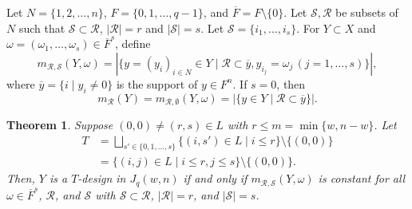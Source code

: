 \documentclass[a4paper, 11pt]{article}
\newtheorem{theorem}{Theorem}[section]
\theoremstyle{definition}
\begin{document}
Let $N=\{1,2,\ldots, n\}$, $F=\{0,1,\ldots, q-1\}$, and $\overline{F}=F\setminus \{0\}$. 
Let $\mathcal{S}, \mathcal{R}$  be subsets of $N$ such that $\mathcal{S} \subset \mathcal{R}$,  $|\mathcal{R}|=r$ and $|\mathcal{S}|=s$. 
Let $\mathcal{S}=\{i_1,\ldots, i_s\}$.  
For $Y \subset X$ and $\omega=(\omega_1,\ldots, \omega_s) \in \overline{F}^s$, define 
\[
m_{\mathcal{R},\mathcal{S}}(Y,\omega)
=|\{y=(y_i)_{i \in N} \in Y  \mid \mathcal{R} \subset \overline{y}, y_{i_j}=\omega_j\, (j=1,\ldots,s)  \}|, 
\]
where $\overline{y}=\{i \mid y_i\ne 0\}$ is the support of $y\in F^n$. If $s=0$, then 
\[
m_{\mathcal{R}}(Y)=m_{\mathcal{R},\emptyset}(Y,\omega)=|\{y \in Y  \mid \mathcal{R} \subset \overline{y} \}|. 
\]
\begin{theorem}\label{thm:T-design}
Suppose $(0,0)\ne (r,s) \in L$ with $r \leq m=\min\{w,n-w\}$. 
Let 
\begin{align*}
T&=\bigsqcup_{s'\in \{0,1,\ldots,s\}}\{(i,s') \in L \mid  i \leq r\}\setminus \{(0,0)\}\\    
&= \{(i,j) \in L \mid i \leq r, j\leq s\} \setminus \{(0,0)\}. 
\end{align*}
Then, $Y$ is a $T$-design in $J_q(w,n)$ if and only if 
$m_{\mathcal{R},\mathcal{S}}(Y,\omega)$ is constant for all $\omega \in \overline{F}^s$, $\mathcal{R}$, and $\mathcal{S}$ with $\mathcal{S}\subset \mathcal{R}$, $|\mathcal{R}|=r$, and $|\mathcal{S}|=s$.  
\end{theorem} 
\end{document}

